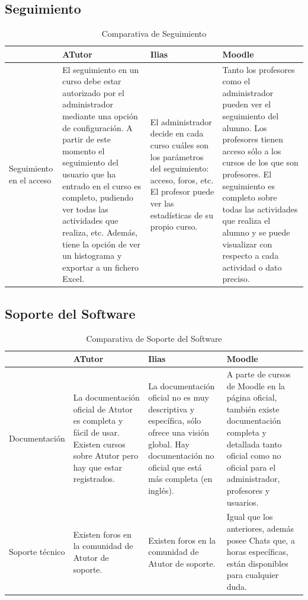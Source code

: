 \newpage
\subsection{Seguimiento}

\begin{table}[h]
\centering
\begin{tabular}{ | p{} | p{} | p{} | p{} | }
	\hline
	  & \textbf{ATutor} & \textbf{Ilias} & \textbf{Moodle} \\
	\hline 
	Seguimiento en el acceso  & 
	El seguimiento en un curso debe estar autorizado por el administrador mediante una opción de configuración. A partir de este momento el seguimiento del usuario que ha entrado en el curso es completo, pudiendo ver todas las actividades que realiza, etc. Además, tiene la opción de ver un histograma y exportar a un fichero Excel. & 
	El administrador decide en cada curso cuáles son los parámetros del seguimiento: acceso, foros, etc. El profesor puede ver las estadísticas de su propio curso.  & 
	Tanto los profesores como el administrador pueden ver el seguimiento del alumno. Los profesores tienen acceso sólo a los cursos de los que son profesores. El seguimiento es completo sobre todas las actividades que realiza el alumno y se puede visualizar con respecto a cada actividad o dato preciso.  \\
	\hline
\end{tabular}
\caption{Comparativa de Seguimiento}
\end{table}

\newpage
\subsection{Soporte del Software}

\begin{table}[h]
\centering
\begin{tabular}{ | p{} | p{} | p{} | p{} | }
	\hline
	  & \textbf{ATutor} & \textbf{Ilias} & \textbf{Moodle} \\
	\hline 
	Documentación  & 
	La documentación oficial de Atutor es completa y fácil de usar. Existen cursos sobre Atutor pero hay que estar registrados. & 
	La documentación oficial no es muy descriptiva y específica, sólo ofrece una visión global. Hay documentación no oficial que está más completa (en inglés).  & 
	A parte de cursos de Moodle en la página oficial, también existe documentación completa y detallada tanto oficial como no oficial para el administrador, profesores y usuarios.  \\
	\hline
	Soporte técnico  & 
	Existen foros en la comunidad de Atutor de soporte. & 
	Existen foros en la comunidad de Atutor de soporte. & 
	Igual que los anteriores, además posee Chats que, a horas específicas, están disponibles para cualquier duda.  \\
	\hline
\end{tabular}
\caption{Comparativa de Soporte del Software}
\end{table}

